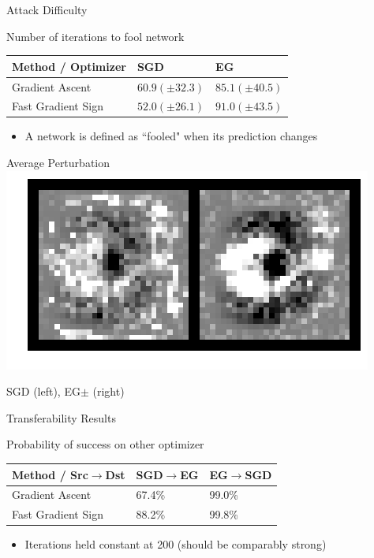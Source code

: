 \documentclass{beamer}
\begin{document}
	\begin{frame}{Attack Difficulty}
		\begin{block}{Number of iterations to fool network}
			\begin{center}
				\begin{tabular}{ l | l | l }
					Method / Optimizer & SGD & EG \\ \hline
					Gradient Ascent & $60.9 (\pm 32.3)$ & $85.1 (\pm 40.5)$ \\ \hline
					Fast Gradient Sign & $52.0 (\pm 26.1)$ & $91.0 (\pm 43.5)$
				\end{tabular}
			\end{center}
		\end{block}
		\begin{itemize}
			\item A network is defined as ``fooled" when its prediction changes
		\end{itemize}
	\end{frame}
	
	\begin{frame}{Average Perturbation}
		\centering
		\includegraphics[width=\textwidth]{avg_attack_3}
		
		SGD (left), EG$\pm$ (right)
	\end{frame}
	
	\begin{frame}{Transferability Results}
		\begin{block}{Probability of success on other optimizer}
			\begin{center}
				\begin{tabular}{ l | l | l }
					Method / Src$\rightarrow$Dst & SGD$\rightarrow$EG & EG$\rightarrow$SGD  \\ \hline
					Gradient Ascent & 67.4\% & 99.0\% \\ \hline
					Fast Gradient Sign & 88.2\% & 99.8\%
				\end{tabular}
			\end{center}
		\end{block}
		\begin{itemize}
			\item Iterations held constant at 200 (should be comparably strong)
		\end{itemize}
	\end{frame}
	
\end{document}
